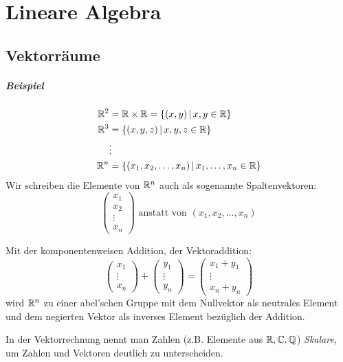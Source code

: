 \chapter{Lineare Algebra}
\section{Vektorräume}
\paragraph{Beispiel}
\begin{align*}
  \mathbb{R}^2&=\mathbb{R}\times\mathbb{R}=\left\{ (x,y) \,\middle|\, x,y\in\mathbb{R} \right\}\\
  \mathbb{R}^3&=\left\{ (x,y,z) \,\middle|\, x,y,z\in\mathbb{R} \right\}\\
  &\vdots\\
  \mathbb{R}^n&=\left\{ (x_1,x_2,\ldots,x_n) \,\middle|\, x_1,\ldots,x_n\in\mathbb{R} \right\}\\
\end{align*}
Wir schreiben die Elemente von $\mathbb{R}^n$ auch als sogenannte Spaltenvektoren:
\begin{equation*}
  \begin{pmatrix}
    x_1\\
    x_2\\
    \vdots\\
    x_n
  \end{pmatrix} \text{ anstatt von } (x_1,x_2,\ldots,x_n)
\end{equation*}

Mit der komponentenweisen Addition, der Vektoraddition:
\begin{equation*}
  \begin{pmatrix}
    x_1\\
    \vdots\\
    x_n
  \end{pmatrix}
  +
  \begin{pmatrix}
    y_1\\
    \vdots\\
    y_n
  \end{pmatrix}
  =
  \begin{pmatrix}
    x_1+y_1\\
    \vdots\\
    x_n+y_n
  \end{pmatrix}
\end{equation*}
wird $\mathbb{R}^n$ zu einer abel'schen Gruppe mit dem Nullvektor als neutrales Element und dem negierten Vektor als inverses Element bezüglich der Addition.

In der Vektorrechnung nennt man Zahlen (z.B. Elemente aus $\mathbb{R},\mathbb{C},\mathbb{Q}$) \emph{Skalare}, um Zahlen und Vektoren deutlich zu unterscheiden.

